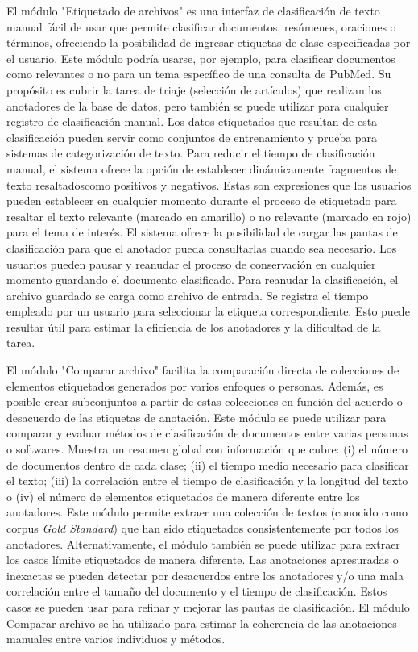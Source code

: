 El módulo "Etiquetado de archivos" es una interfaz de clasificación de texto manual fácil de usar que permite clasificar documentos, resúmenes, oraciones o términos, ofreciendo la posibilidad de ingresar etiquetas de clase especificadas por el usuario.
Este módulo podría usarse, por ejemplo, para clasificar documentos como relevantes o no para un tema específico de una consulta de PubMed.
Su propósito es cubrir la tarea de triaje (selección de artículos) que realizan los anotadores de la base de datos, pero también se puede utilizar para cualquier registro de clasificación manual.
Los datos etiquetados que resultan de esta clasificación pueden servir como conjuntos de entrenamiento y prueba para sistemas de categorización de texto.
Para reducir el tiempo de clasificación manual, el sistema ofrece la opción de establecer dinámicamente fragmentos de texto resaltadoscomo positivos y negativos.
Estas son expresiones que los usuarios pueden establecer en cualquier momento durante el proceso de etiquetado para resaltar el texto relevante (marcado en amarillo) o no relevante (marcado en rojo) para el tema de interés.
El sistema ofrece la posibilidad de cargar las pautas de clasificación para que el anotador pueda consultarlas cuando sea necesario.
Los usuarios pueden pausar y reanudar el proceso de conservación en cualquier momento guardando el documento clasificado.
Para reanudar la clasificación, el archivo guardado se carga como archivo de entrada.
Se registra el tiempo empleado por un usuario para seleccionar la etiqueta correspondiente.
Esto puede resultar útil para estimar la eficiencia de los anotadores y la dificultad de la tarea.

El módulo "Comparar archivo" facilita la comparación directa de colecciones de elementos etiquetados generados por varios enfoques o personas.
Además, es posible crear subconjuntos a partir de estas colecciones en función del acuerdo o desacuerdo de las etiquetas de anotación.
Este módulo se puede utilizar para comparar y evaluar métodos de clasificación de documentos entre varias personas o softwares.
Muestra un resumen global con información que cubre:
(i) el número de documentos dentro de cada clase;
(ii) el tiempo medio necesario para clasificar el texto;
(iii) la correlación entre el tiempo de clasificación y la longitud del texto o
(iv) el número de elementos etiquetados de manera diferente entre los anotadores.
Este módulo permite extraer una colección de textos (conocido como corpus \textit{Gold Standard}) que han sido etiquetados consistentemente por todos los anotadores.
Alternativamente, el módulo también se puede utilizar para extraer los casos límite etiquetados de manera diferente.
Las anotaciones apresuradas o inexactas se pueden detectar por desacuerdos entre los anotadores y/o una mala correlación entre el tamaño del documento y el tiempo de clasificación.
Estos casos se pueden usar para refinar y mejorar las pautas de clasificación.
El módulo Comparar archivo se ha utilizado para estimar la coherencia de las anotaciones manuales entre varios individuos y métodos.

